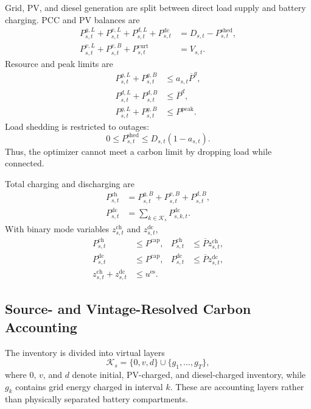 \documentclass[times]{elsarticle}
\begin{document}
Grid, PV, and diesel generation are split between direct load supply and
battery charging. PCC and PV balances are
\begin{align}
P^{g,L}_{s,t}+P^{v,L}_{s,t}+P^{d,L}_{s,t}+P^{\mathrm{dc}}_{s,t}
&=D_{s,t}-P^{\mathrm{shed}}_{s,t},
\label{eq:pcc_balance}\\
P^{v,L}_{s,t}+P^{v,B}_{s,t}+P^{\mathrm{curt}}_{s,t}
&=V_{s,t}.
\label{eq:pv_balance}
\end{align}
Resource and peak limits are
\begin{align}
P^{g,L}_{s,t}+P^{g,B}_{s,t}&\le a_{s,t}\overline P^g,
\label{eq:grid_limit}\\
P^{d,L}_{s,t}+P^{d,B}_{s,t}&\le\overline P^d,
\label{eq:diesel_limit}\\
P^{g,L}_{s,t}+P^{g,B}_{s,t}&\le P^{\mathrm{peak}}.
\label{eq:peak_limit}
\end{align}
Load shedding is restricted to outages:
\begin{equation}
0\le P^{\mathrm{shed}}_{s,t}\le D_{s,t}(1-a_{s,t}).
\label{eq:outage_shedding}
\end{equation}
Thus, the optimizer cannot meet a carbon limit by dropping load while connected.

Total charging and discharging are
\begin{align}
P^{\mathrm{ch}}_{s,t}&=P^{g,B}_{s,t}+P^{v,B}_{s,t}+P^{d,B}_{s,t},
\label{eq:total_charge}\\
P^{\mathrm{dc}}_{s,t}&=\sum_{k\in\mathcal K_s}P^{\mathrm{dc}}_{s,k,t}.
\label{eq:total_discharge}
\end{align}
With binary mode variables $z^{\mathrm{ch}}_{s,t}$ and
$z^{\mathrm{dc}}_{s,t}$,
\begin{align}
P^{\mathrm{ch}}_{s,t}&\le P^{\mathrm{cap}}, &
P^{\mathrm{ch}}_{s,t}&\le\overline Pz^{\mathrm{ch}}_{s,t},
\label{eq:charge_limit}\\
P^{\mathrm{dc}}_{s,t}&\le P^{\mathrm{cap}}, &
P^{\mathrm{dc}}_{s,t}&\le\overline Pz^{\mathrm{dc}}_{s,t},
\label{eq:discharge_limit}\\
z^{\mathrm{ch}}_{s,t}+z^{\mathrm{dc}}_{s,t}&\le u^{\mathrm{es}}.
\label{eq:mode}
\end{align}

\subsection{Source- and Vintage-Resolved Carbon Accounting}

The inventory is divided into virtual layers
\begin{equation}
\mathcal K_s=\{0,v,d\}\cup\{g_1,\ldots,g_T\},
\label{eq:layers}
\end{equation}
where $0$, $v$, and $d$ denote initial, PV-charged, and diesel-charged
inventory, while $g_k$ contains grid energy charged in interval $k$. These are
accounting layers rather than physically separated battery compartments.
\end{document}
